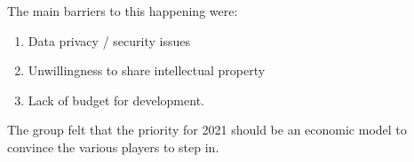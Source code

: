 The main barriers to this happening were:

\begin{enumerate}
\item
  Data privacy / security issues
\item
  Unwillingness to share intellectual property
\item
  Lack of budget for development.
\end{enumerate}

The group felt that the priority for 2021 should be an economic model to convince the various players to step in.